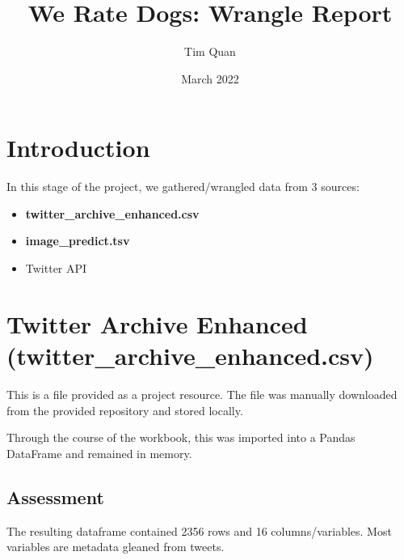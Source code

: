 \documentclass{report}
\title{We Rate Dogs: Wrangle Report}
\date{March 2022}
\author{Tim Quan}
\begin{document}
\maketitle
\section{Introduction}

In this stage of the project, we gathered/wrangled data from 3 sources:
\begin{itemize}
	\item \textbf{twitter\_archive\_enhanced.csv}
	\item \textbf{image\_predict.tsv}
	\item Twitter API
\end{itemize}

\section{Twitter Archive Enhanced \textbf{(twitter\_archive\_enhanced.csv)}}

This is a file provided as a project resource.
The file was manually downloaded from the provided repository and stored locally.

Through the course of the workbook, this was imported into a Pandas DataFrame and remained in memory.

	\subsection{Assessment}
	The resulting dataframe contained 2356 rows and 16 columns/variables. Most variables are metadata gleaned from tweets. 
\end{document}
